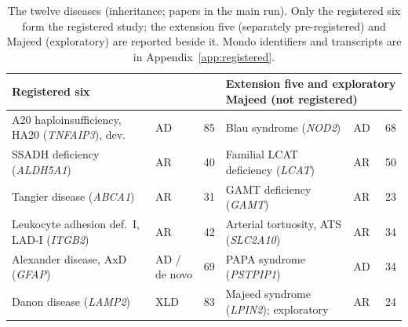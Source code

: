 \documentclass{article} %
\begin{document}
\begin{table}[t]
\caption{The twelve diseases (inheritance; papers in the main run). Only the registered six form the registered study; the extension five (separately pre-registered) and Majeed (exploratory) are reported beside it. Mondo identifiers and transcripts are in Appendix~\ref{app:registered}.}
\label{tab:diseases}
\begin{center}
\scriptsize
\begin{tabular}{llr@{\hspace{1.5em}}llr}
\toprule
\multicolumn{3}{l}{Registered six} & \multicolumn{3}{l}{Extension five and exploratory Majeed (not registered)} \\
\midrule
A20 haploinsufficiency, HA20 (\emph{TNFAIP3}), dev. & AD & 85 & Blau syndrome (\emph{NOD2}) & AD & 68 \\
SSADH deficiency (\emph{ALDH5A1}) & AR & 40 & Familial LCAT deficiency (\emph{LCAT}) & AR & 50 \\
Tangier disease (\emph{ABCA1}) & AR & 31 & GAMT deficiency (\emph{GAMT}) & AR & 23 \\
Leukocyte adhesion def.\ I, LAD-I (\emph{ITGB2}) & AR & 42 & Arterial tortuosity, ATS (\emph{SLC2A10}) & AR & 34 \\
Alexander disease, AxD (\emph{GFAP}) & AD / de novo & 69 & PAPA syndrome (\emph{PSTPIP1}) & AD & 34 \\
Danon disease (\emph{LAMP2}) & XLD & 83 & Majeed syndrome (\emph{LPIN2}); exploratory & AR & 24 \\
\bottomrule
\end{tabular}
\end{center}
\end{table}
\end{document}
